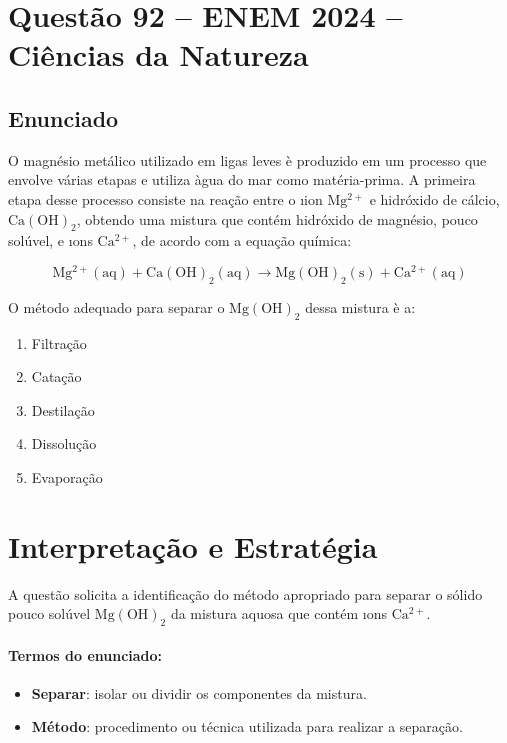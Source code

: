 \documentclass{article}
\begin{document}
\section*{Questão 92 -- ENEM 2024 -- Ciências da Natureza}

\subsection*{Enunciado}
O magnésio metálico utilizado em ligas leves \`e produzido em um processo que envolve várias etapas e utiliza \`agua do mar como matéria-prima. A primeira etapa desse processo consiste na reação entre o \i{ion} $\mathrm{Mg^{2+}}$ e hidróxido de cálcio, $\mathrm{Ca(OH)_2}$, obtendo uma mistura que contém hidróxido de magnésio, pouco solúvel, e \i{ons} $\mathrm{Ca^{2+}}$, de acordo com a equação química:

\begin{equation*}
\mathrm{Mg^{2+} (aq) + Ca(OH)_2 (aq) \rightarrow Mg(OH)_2 (s) + Ca^{2+} (aq)}
\end{equation*}

O método adequado para separar o $\mathrm{Mg(OH)_2}$ dessa mistura \`e a:

\begin{enumerate}
\item Filtração
\item Catação
\item Destilação
\item Dissolução
\item Evaporação
\end{enumerate}

\section*{Interpretação e Estratégia}
\noindent A questão solicita a identificação do método apropriado para separar o sólido pouco solúvel $\mathrm{Mg(OH)_2}$ da mistura aquosa que contém \i{ons} $\mathrm{Ca^{2+}}$.

\paragraph{Termos do enunciado:}
\begin{itemize}
\item \textbf{Separar}: isolar ou dividir os componentes da mistura.
\item \textbf{Método}: procedimento ou técnica utilizada para realizar a separação.
\end{itemize}
\end{document}
